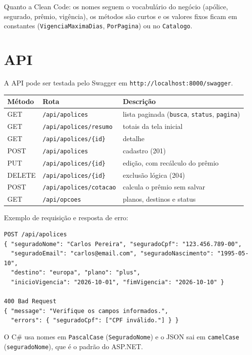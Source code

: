 \documentclass[11pt,a4paper]{article}
\begin{document}
Quanto a Clean Code: os nomes seguem o vocabulário do negócio (apólice, segurado, prêmio,
vigência), os métodos são curtos e os valores fixos ficam em constantes
(\texttt{VigenciaMaximaDias}, \texttt{PorPagina}) ou no \texttt{Catalogo}.

\section{API}

A API pode ser testada pelo Swagger em \texttt{http://localhost:8000/swagger}.

\begin{center}
\begin{tabularx}{\linewidth}{@{}llX@{}}
\toprule
Método & Rota & Descrição \\
\midrule
GET & \texttt{/api/apolices} & lista paginada (\texttt{busca}, \texttt{status}, \texttt{pagina}) \\
GET & \texttt{/api/apolices/resumo} & totais da tela inicial \\
GET & \texttt{/api/apolices/\{id\}} & detalhe \\
POST & \texttt{/api/apolices} & cadastro (201) \\
PUT & \texttt{/api/apolices/\{id\}} & edição, com recálculo do prêmio \\
DELETE & \texttt{/api/apolices/\{id\}} & exclusão lógica (204) \\
POST & \texttt{/api/apolices/cotacao} & calcula o prêmio sem salvar \\
GET & \texttt{/api/opcoes} & planos, destinos e status \\
\bottomrule
\end{tabularx}
\end{center}

Exemplo de requisição e resposta de erro:

\begin{lstlisting}[style=txt]
POST /api/apolices
{ "seguradoNome": "Carlos Pereira", "seguradoCpf": "123.456.789-00",
  "seguradoEmail": "carlos@email.com", "seguradoNascimento": "1995-05-10",
  "destino": "europa", "plano": "plus",
  "inicioVigencia": "2026-10-01", "fimVigencia": "2026-10-10" }

400 Bad Request
{ "message": "Verifique os campos informados.",
  "errors": { "seguradoCpf": ["CPF inválido."] } }
\end{lstlisting}

O C\# usa nomes em \texttt{PascalCase} (\texttt{SeguradoNome}) e o JSON sai em \texttt{camelCase}
(\texttt{seguradoNome}), que é o padrão do ASP.NET.
\end{document}

